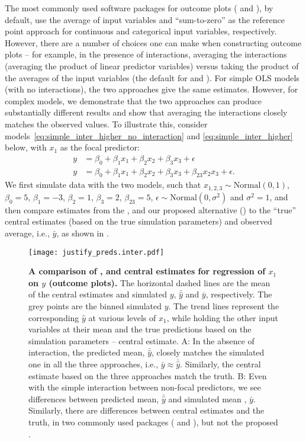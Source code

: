 The most commonly used  software packages for outcome plots ( and ), by default, use the average of input variables and ``sum-to-zero'' as the reference point approach for continuous and categorical input variables, respectively. However, there are a number of choices one can make when constructing outcome plots -- for example, in the presence of interactions, averaging the interactions (averaging the product of linear predictor variables) versus taking the product of the averages of the input variables (the default for  and ). For simple OLS models (with no interactions), the two approaches give the same estimates. However, for complex models, we demonstrate that the two approaches can produce substantially different results and show that averaging the interactions closely matches the observed values. To illustrate this, consider models~\ref{eq:simple_inter_higher_no_interaction} and \ref{eq:simple_inter_higher} below, with $x_1$ as the focal predictor:
%
\begin{align}
y &= \beta_0 + \beta_1x_1 + \beta_2x_2 + \beta_3x_3 + \epsilon \label{eq:simple_inter_higher_no_interaction}\\
y &= \beta_0 + \beta_1x_1 + \beta_2x_2 + \beta_3x_3 + \beta_{23}x_2x_3 + \epsilon \label{eq:simple_inter_higher}.
\end{align}
%
We first simulate data with the two models, such that $x_{1,2,3} \sim \mathrm{Normal}(0, 1)$, $\beta_0 = 5$, $\beta_1 = -3$, $\beta_2 = 1$, $\beta_3 = 2$, $\beta_{23} = 5$, $\epsilon \sim \mathrm{Normal}(0, \sigma^2)$ and $\sigma^2 = 1$, and then compare estimates from the ,  and our proposed alternative () to the ``true'' central estimates (based on the true simulation parameters) and observed average, i.e., $\bar{y}$, as shown in .
%
\begin{figure}
\begin{center}
\texttt{[image: justify\_preds.inter.pdf]}
\end{center}
\caption{{\bf A comparison of ,  and  central estimates for regression of $x_1$ on $y$ (outcome plots).} The horizontal dashed lines are the mean of the central estimates and simulated $y$, $\bar{\hat{y}}$ and $\bar{y}$, respectively. The grey points are the binned simulated $y$. The trend lines represent the corresponding $\hat{y}$ at various levels of $x_1$, while holding the other input variables at their mean and the true predictions based on the simulation parameters -- central estimate. A: In the absence of interaction, the predicted mean, $\bar{\hat{y}}$, closely matches the simulated one in all the three approaches, i.e., $\bar{y} \approx \bar{\hat{y}}$. Similarly, the central estimate based on the three approaches match the truth. B: Even with the simple interaction between non-focal predictors, we see differences between predicted mean, $\bar{\hat{y}}$ and simulated mean , $\bar{y}$. Similarly, there are differences between central estimates and the truth, in two commonly used packages ( and ), but not the proposed .}
\label{fig:justify_plots}
\end{figure}
